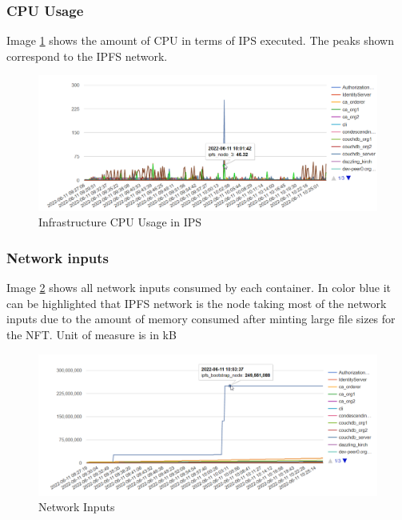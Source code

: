 \subsubsection{CPU Usage}
Image \ref{fig:dockerCPU} shows the amount of \ac{CPU} in terms of \ac{IPS} executed. The peaks shown correspond to the IPFS network.
\begin{figure}[h!]
        \centering
        \includegraphics[width=15cm]{img/Docker_CPU.png}
        \caption{Infrastructure CPU Usage in IPS}
        \label{fig:dockerCPU}
\end{figure}

\subsubsection{Network inputs}
Image \ref{fig:dockerNetIn} shows all  network inputs consumed by each container. In color blue it can be highlighted that IPFS network is the node taking most of the network inputs due to the amount of memory consumed after minting large file sizes for the \ac{NFT}. Unit of measure is in \ac{kB}
\begin{figure}[h!]
        \centering
        \includegraphics[width=15cm]{img/Docker_NetIn.png}
        \caption{Network Inputs}
        \label{fig:dockerNetIn}
\end{figure}

